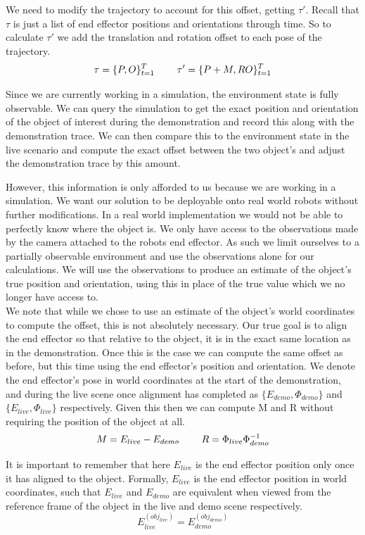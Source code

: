We need to modify the trajectory to account for this offset, getting $\tau'$. Recall that $\tau$ is just a list of end effector positions and orientations through time. So to calculate $\tau'$ we add the translation and rotation offset to each pose of the trajectory.
$$\tau = \{P, O\}_{t=1}^T \operatorname{\operatorname{\: \: \: \:} \operatorname{\: \: \: \:}} \tau' = \{P + M, RO\}_{t=1}^T$$

Since we are currently working in a simulation, the environment state is fully observable. We can query the simulation to get the exact position and orientation of the object of interest during the demonstration and record this along with the demonstration trace. We can then compare this to the environment state in the live scenario and compute the exact offset between the two object's and adjust the demonstration trace by this amount.

However, this information is only afforded to us because we are working in a simulation. We want our solution to be deployable onto real world robots without further modifications. In a real world implementation we would not be able to perfectly know where the object is. We only have access to the observations made by the camera attached to the robots end effector. As such we limit ourselves to a partially observable environment and use the observations alone for our calculations. We will use the observations to produce an estimate of the object's true position and orientation, using this in place of the true value which we no longer have access to.\\

We note that while we chose to use an estimate of the object's world coordinates to compute the offset, this is not absolutely necessary. Our true goal is to align the end effector so that relative to the object, it is in the exact same location as in the demonstration. Once this is the case we can compute the same offset as before, but this time using the end effector's position and orientation. We denote the end effector's pose in world coordinates at the start of the demonstration, and during the live scene once alignment has completed as $\{E_{demo}, \Phi_{demo}\}$ and $\{E_{live}, \Phi_{live}\}$ respectively. Given this then we can compute M and R without requiring the position of the object at all.
$$M = E_{live} - E_{demo} \operatorname{\operatorname{\: \: \: \:} \operatorname{\: \: \: \:}} R = \Phi_{live} \Phi_{demo}^{-1}$$

It is important to remember that here $E_{live}$ is the end effector position only once it has aligned to the object. Formally, $E_{live}$ is the end effector position in world coordinates, such that $E_{live}$ and $E_{demo}$ are equivalent when viewed from the reference frame of the object in the live and demo scene respectively.
$$E_{live}^{(obj_{live})} = E_{demo}^{(obj_{demo})}$$

